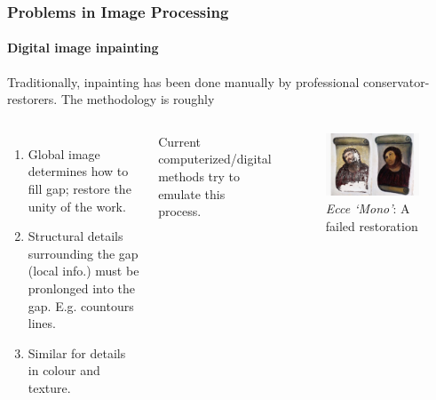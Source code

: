 \documentclass{beamer}
\begin{document}

\begin{frame}
\frametitle{Problems in Image Processing}
\framesubtitle{Digital image inpainting}

Traditionally, inpainting has been done manually by professional conservator-restorers. The methodology is roughly

\begin{columns}[c] %
\begin{enumerate}
	\item Global image determines how to fill gap; restore the unity of the work.
	\item Structural details surrounding the gap (\alert{local} info.) must be
	 pronlonged into the gap. E.g. countours lines.
	\item Similar for details in colour and texture.
\end{enumerate}
Current computerized/digital methods try to emulate this process.

\begin{figure} %
\centering
	\includegraphics[width=\columnwidth]{../figures/fresco.jpg}
\caption{\textit{Ecce `Mono'}: A failed restoration}
\end{figure}
\end{columns}

\end{frame}

\end{document}
